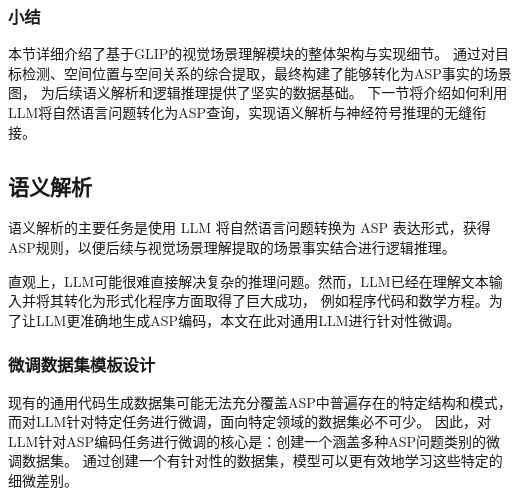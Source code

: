 \subsubsection{小结}
本节详细介绍了基于GLIP的视觉场景理解模块的整体架构与实现细节。
通过对目标检测、空间位置与空间关系的综合提取，最终构建了能够转化为ASP事实的场景图，
为后续语义解析和逻辑推理提供了坚实的数据基础。
下一节将介绍如何利用LLM将自然语言问题转化为ASP查询，实现语义解析与神经符号推理的无缝衔接。
\subsection{语义解析}
语义解析的主要任务是使用 LLM 将自然语言问题转换为 ASP 表达形式，获得ASP规则，以便后续与视觉场景理解提取的场景事实结合进行逻辑推理。

直观上，LLM可能很难直接解决复杂的推理问题。然而，LLM已经在理解文本输入并将其转化为形式化程序方面取得了巨大成功，
例如程序代码\cite{gao2023pal}和数学方程\cite{he2023solving}。为了让LLM更准确地生成ASP编码，本文在此对通用LLM进行针对性微调。
\subsubsection{微调数据集模板设计}
现有的通用代码生成数据集可能无法充分覆盖ASP中普遍存在的特定结构和模式，而对LLM针对特定任务进行微调，面向特定领域的数据集必不可少。
因此，对LLM针对ASP编码任务进行微调的核心是：创建一个涵盖多种ASP问题类别的微调数据集。
通过创建一个有针对性的数据集，模型可以更有效地学习这些特定的细微差别。

